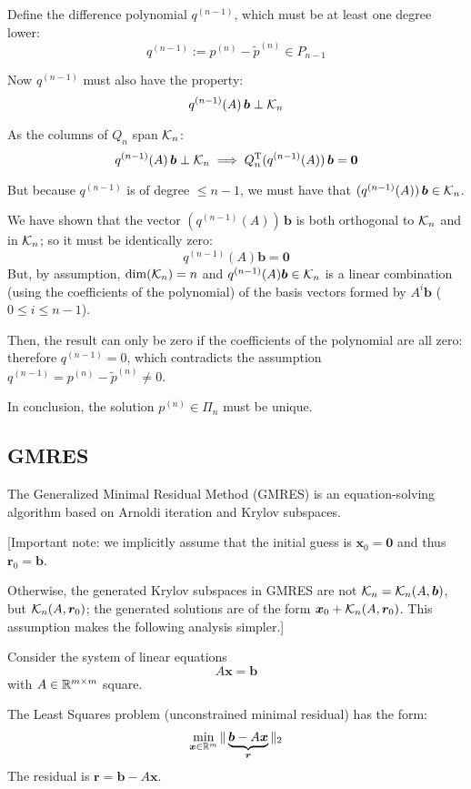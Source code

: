 \documentclass[
  12pt,
  paper=a4,
]{scrartcl} %
\begin{document}
Define the difference polynomial $q^{(n-1)}$, which must be at least one degree lower:
\[
    q^{(n-1)} := p^{(n)}- \tilde{p}^{(n)} \in P_{n-1}
\]

Now $q^{(n-1)}$ must also have the property:
\[
    q^{(n-1)} (A)\,\bm b \perp \mathcal{K}_n
\]

As the columns of $Q_n$ span $\mathcal{K}_n$:
\[
    q^{(n-1)} (A)\,\bm b \perp \mathcal{K}_n
    \implies
    Q_n^{\mathrm{T}} (q^{(n-1)} (A))\,\bm b = \bm 0
\]

But because $q^{(n-1)}$ is of degree $\le n-1$, we must have that $(q^{(n-1)} (A))\,\bm b \in \mathcal{K}_n$.

We have shown that the vector $(q^{(n-1)} (A))\,\bm b$ is both orthogonal to $\mathcal{K}_n$ and in $\mathcal{K}_n$; so it must be identically zero:
\[
    q^{(n-1)}(A)\bm b = \bm 0
\]
But, by assumption, $\dim(\mathcal{K}_n)=n$ and $q^{(n-1)}(A)\bm b\in\mathcal{K}_n$ is a linear combination (using the coefficients of the polynomial) of the basis vectors formed by $A^{i}\bm b$ ($0\le i \le n-1$).

Then, the result can only be zero if the coefficients of the polynomial are all zero: therefore $q^{(n-1)} = 0$, which contradicts the assumption $q^{(n-1)} = p^{(n)}- \tilde{p}^{(n)} \neq 0$.

In conclusion, the solution $p^{(n)}\in \Pi_n$ must be unique.

\subsection*{GMRES}

The Generalized Minimal Residual Method (GMRES) is an equation-solving algorithm based on Arnoldi iteration and Krylov subspaces.

[Important note: we implicitly assume that the initial guess is $\bm x_0=\bm 0$ and thus $\bm r_0=\bm b$.

Otherwise, the generated Krylov subspaces in GMRES are not $\mathcal{K}_n=\mathcal{K}_n(A, \bm b)$, but $\mathcal{K}_n(A, \bm r_0)$; the generated solutions are of the form $\bm x_0 + \mathcal{K}_n(A, \bm r_0)$. This assumption makes the following analysis simpler.]

Consider the system of linear equations
\[
    A\bm x =\bm b
\]
with $A\in\mathbb R^{m\times m}$ square.

The Least Squares problem (unconstrained minimal residual) has the form:
\[
    \min_{\bm x\in\mathbb R^{m}}\|
        \underbrace{\bm b - A\bm x}_{\bm r}
    \|_2
\]
The residual is $\bm r = \bm b - A\bm x$.
\end{document}
